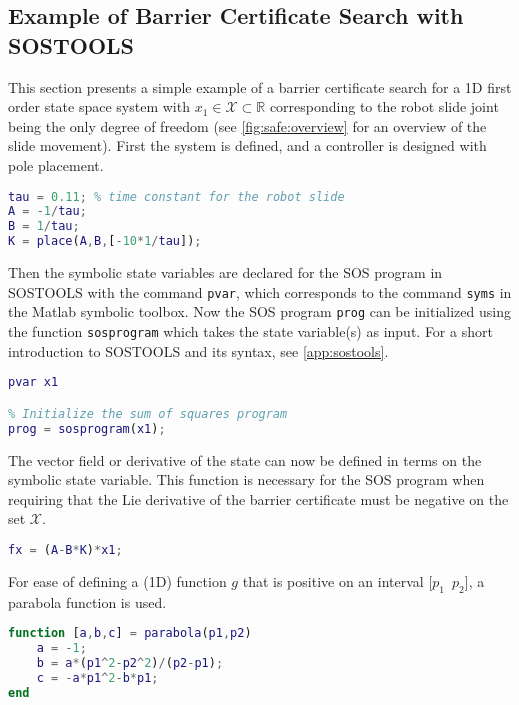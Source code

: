 \subsection{Example of Barrier Certificate Search with SOSTOOLS}
This section presents a simple example of a barrier certificate search for a 1D first order state space system with $x_1\in\mathcal{X}\subset\mathbb{R}$ corresponding to the robot slide joint being the only degree of freedom (see \autoref{fig:safe:overview} for an overview of the slide movement). First the system is defined, and a controller is designed with pole placement.
\begin{lstlisting}[language=matlab]
% Define state-space system with x1 = robot position
tau = 0.11; % time constant for the robot slide
A = -1/tau;
B = 1/tau;
K = place(A,B,[-10*1/tau]);
\end{lstlisting}
Then the symbolic state variables are declared for the SOS program in SOSTOOLS with the command \texttt{pvar}, which corresponds to the command \texttt{syms} in the Matlab symbolic toolbox. Now the SOS program \texttt{prog} can be initialized using the function \texttt{sosprogram} which takes the state variable(s) as input. For a short introduction to SOSTOOLS and its syntax, see \autoref{app:sostools}.
\begin{lstlisting}[language=matlab]
% Declare state variables
pvar x1

% Initialize the sum of squares program
prog = sosprogram(x1);
\end{lstlisting}
The vector field or derivative of the state can now be defined in terms on the symbolic state variable. This function is necessary for the SOS program when requiring that the Lie derivative of the barrier certificate must be negative on the set $\mathcal{X}$.
\begin{lstlisting}[language=matlab]
% Vector field dx/dt = fx (closed loop)
fx = (A-B*K)*x1;
\end{lstlisting}
For ease of defining a (1D) function $g$ that is positive on an interval [$p_1\,\,\, p_2$], a parabola function is used.
\begin{lstlisting}[language=matlab]
function [a,b,c] = parabola(p1,p2)
	a = -1;
	b = a*(p1^2-p2^2)/(p2-p1);
	c = -a*p1^2-b*p1;
end
\end{lstlisting}
